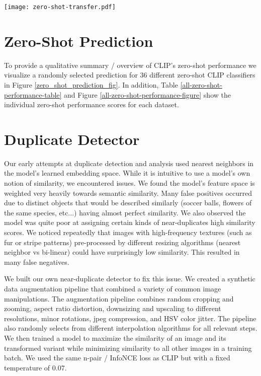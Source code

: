 \documentclass{article}
\begin{document}
\begin{table*}[]
\begin{tabular}{cc|cccccccccccccccccccccccccccc}
        \\
        \bottomrule
    \end{tabular}
    \caption{Zero-shot performance of CLIP models over 27 datasets.}
    \label{tab:zero-shot-big-table}

\label{all-zero-shot-performance-table}
\vspace{2em}
\texttt{[image: zero-shot-transfer.pdf]}
\label{all-zero-shot-performance-figure}
\end{table*}

\clearpage


\section{Zero-Shot Prediction}

To provide a qualitative summary / overview of CLIP's zero-shot performance we visualize a randomly selected prediction for 36 different zero-shot CLIP classifiers in Figure \ref{zero_shot_prediction_fig}. 
In addition, Table \ref{all-zero-shot-performance-table} and Figure \ref{all-zero-shot-performance-figure} show the individual zero-shot performance scores for each dataset.

\section{Duplicate Detector}
\label{dupdet}

Our early attempts at duplicate detection and analysis used nearest neighbors in the model's learned embedding space. While it is intuitive to use a model's own notion of similarity, we encountered issues. We found the model's feature space is weighted very heavily towards semantic similarity. Many false positives occurred due to distinct objects that would be described similarly (soccer balls, flowers of the same species, etc...) having almost perfect similarity. We also observed the model was quite poor at assigning certain kinds of near-duplicates high similarity scores. We noticed repeatedly that images with high-frequency textures (such as fur or stripe patterns) pre-processed by different resizing algorithms (nearest neighbor vs bi-linear) could have surprisingly low similarity. This resulted in many false negatives. 

We built our own near-duplicate detector to fix this issue. We created a synthetic data augmentation pipeline that combined a variety of common image manipulations. The augmentation pipeline combines random cropping and zooming, aspect ratio distortion, downsizing and upscaling to different resolutions, minor rotations, jpeg compression, and HSV color jitter. The pipeline also randomly selects from different interpolation algorithms for all relevant steps. We then trained a model to maximize the similarity of an image and its transformed variant while minimizing similarity to all other images in a training batch. We used the same n-pair / InfoNCE loss as CLIP but with a fixed temperature of 0.07.
\end{document}
